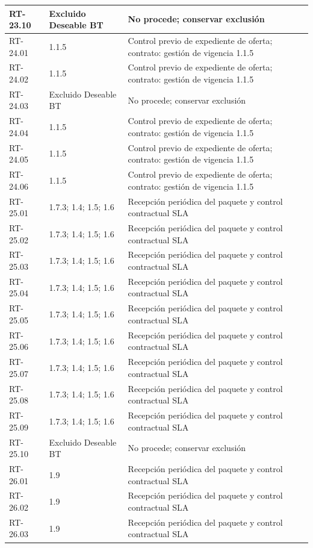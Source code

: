 \begin{longtable}{L{23mm}L{46mm}L{72mm}}
RT-23.10 & Excluido Deseable BT & No procede; conservar exclusión\\\hline
RT-24.01 & 1.1.5 & Control previo de expediente de oferta; contrato: gestión de vigencia 1.1.5\\\hline
RT-24.02 & 1.1.5 & Control previo de expediente de oferta; contrato: gestión de vigencia 1.1.5\\\hline
RT-24.03 & Excluido Deseable BT & No procede; conservar exclusión\\\hline
RT-24.04 & 1.1.5 & Control previo de expediente de oferta; contrato: gestión de vigencia 1.1.5\\\hline
RT-24.05 & 1.1.5 & Control previo de expediente de oferta; contrato: gestión de vigencia 1.1.5\\\hline
RT-24.06 & 1.1.5 & Control previo de expediente de oferta; contrato: gestión de vigencia 1.1.5\\\hline
RT-25.01 & 1.7.3; 1.4; 1.5; 1.6 & Recepción periódica del paquete y control contractual SLA\\\hline
RT-25.02 & 1.7.3; 1.4; 1.5; 1.6 & Recepción periódica del paquete y control contractual SLA\\\hline
RT-25.03 & 1.7.3; 1.4; 1.5; 1.6 & Recepción periódica del paquete y control contractual SLA\\\hline
RT-25.04 & 1.7.3; 1.4; 1.5; 1.6 & Recepción periódica del paquete y control contractual SLA\\\hline
RT-25.05 & 1.7.3; 1.4; 1.5; 1.6 & Recepción periódica del paquete y control contractual SLA\\\hline
RT-25.06 & 1.7.3; 1.4; 1.5; 1.6 & Recepción periódica del paquete y control contractual SLA\\\hline
RT-25.07 & 1.7.3; 1.4; 1.5; 1.6 & Recepción periódica del paquete y control contractual SLA\\\hline
RT-25.08 & 1.7.3; 1.4; 1.5; 1.6 & Recepción periódica del paquete y control contractual SLA\\\hline
RT-25.09 & 1.7.3; 1.4; 1.5; 1.6 & Recepción periódica del paquete y control contractual SLA\\\hline
RT-25.10 & Excluido Deseable BT & No procede; conservar exclusión\\\hline
RT-26.01 & 1.9 & Recepción periódica del paquete y control contractual SLA\\\hline
RT-26.02 & 1.9 & Recepción periódica del paquete y control contractual SLA\\\hline
RT-26.03 & 1.9 & Recepción periódica del paquete y control contractual SLA\\\hline

\end{longtable}
